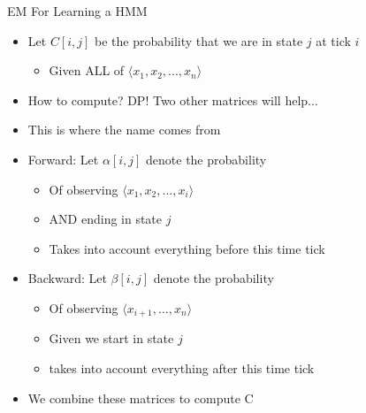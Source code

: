 \documentclass[aspectratio=169]{beamer}
\begin{document}
\begin{frame}{EM For Learning a HMM}

\begin{itemize}
\item Let $C[i,j]$ be the probability that we are in state $j$ at tick $i$
	\begin{itemize}
	\item Given ALL of $\langle x_1, x_2, ..., x_n \rangle$
	\end{itemize}
\item How to compute?  DP! Two other matrices will help...
\item This is where the name comes from
\item Forward: Let $\alpha[i,j]$ denote the probability
	\begin{itemize}
	\item Of observing $\langle x_1, x_2, ..., x_i \rangle$
	\item AND ending in state $j$
	\item Takes into account everything before this time tick
	\end{itemize}
\item Backward: Let $\beta[i,j]$ denote the probability
	\begin{itemize}
	\item Of observing $\langle x_{i+1}, ..., x_n \rangle$
	\item Given we start in state $j$
	\item takes into account everything after this time tick
	\end{itemize}
\item We combine these matrices to compute C
\end{itemize}
\end{frame}
\end{document}
